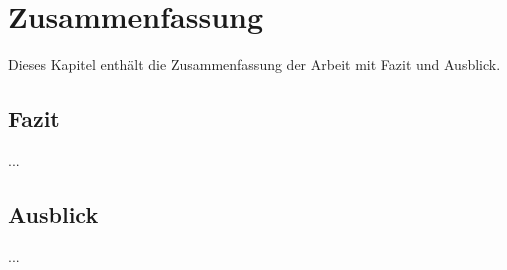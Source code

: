 \chapter{Zusammenfassung}

Dieses Kapitel enthält die Zusammenfassung der Arbeit mit Fazit und Ausblick.

\section{Fazit}

...

\section{Ausblick}

...